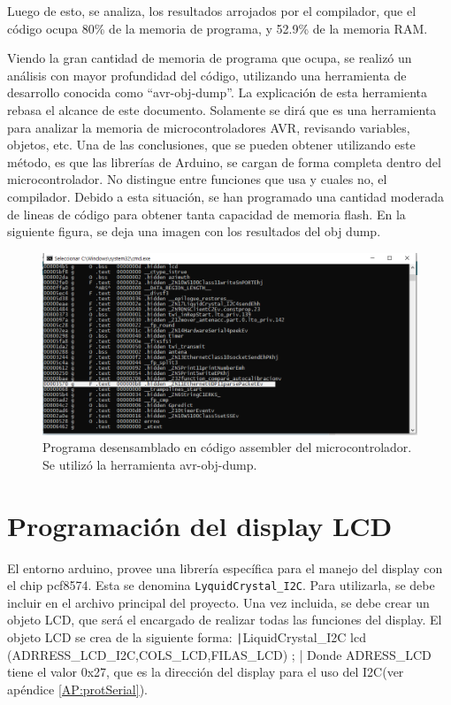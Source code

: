 Luego de esto, se analiza, los resultados arrojados por el compilador, que el código ocupa 80\% de la memoria de programa, y 52.9\% de la memoria RAM. 

Viendo la gran cantidad de memoria de programa que ocupa, se realizó un análisis con mayor profundidad del código, utilizando una herramienta de desarrollo conocida como ``avr-obj-dump''. La explicación de esta herramienta rebasa el alcance de este documento. Solamente se dirá que es una herramienta para analizar la memoria de microcontroladores AVR, revisando variables, objetos, etc. Una de las conclusiones, que se pueden obtener utilizando este método, es que las librerías de Arduino, se cargan de forma completa dentro del microcontrolador. No distingue entre funciones que usa y cuales no, el compilador. Debido a esta situación, se han programado una cantidad moderada de lineas de código para obtener tanta capacidad de memoria flash. En la siguiente figura, se deja una imagen con los resultados del obj dump.  

\begin{figure}[ht]
	\includegraphics{dump_memory}
	\caption{Programa desensamblado en código assembler del microcontrolador. Se utilizó la herramienta avr-obj-dump. }
\end{figure}

\section{Programación del display LCD} 

El entorno arduino, provee una librería específica para el manejo del display con el chip pcf8574. Esta se denomina \texttt{LyquidCrystal_I2C}. Para utilizarla, se debe incluir en el archivo principal del proyecto. Una vez incluida, se debe crear un objeto LCD, que será el encargado de realizar todas las funciones del display. El objeto LCD se crea de la siguiente forma: 
\texttt|LiquidCrystal_I2C lcd (ADRRESS\_LCD_I2C,COLS_LCD,FILAS_LCD) ; |
Donde ADRESS\_LCD tiene el valor 0x27, que es la dirección del display para el uso del I2C(ver apéndice \ref{AP:protSerial}). 

